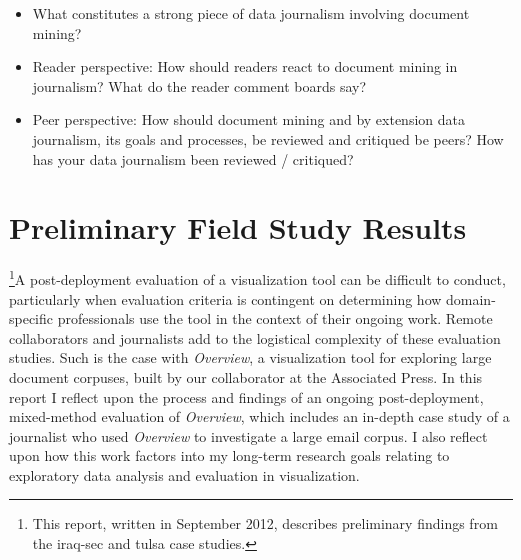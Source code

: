 
\begin{itemize}
    \item What constitutes a strong piece of data journalism involving document mining?
    \item Reader perspective: How should readers react to document mining in journalism? What do the reader comment boards say?
    \item Peer perspective: How should document mining and by extension data journalism, its goals and processes, be reviewed and critiqued be peers? How has your data journalism been reviewed / critiqued?
\end{itemize}


\section{Preliminary Field Study Results}
\label{app:overview:preliminary-results}


\footnote{This report, written in September 2012, describes preliminary findings from the {\sc iraq-sec} and {\sc tulsa} case studies.}A post-deployment evaluation of a visualization tool can be difficult to conduct, particularly when evaluation criteria is contingent on determining how domain-specific professionals use the tool in the context of their ongoing work. 
Remote collaborators and journalists add to the logistical complexity of these evaluation studies. 
Such is the case with {\it Overview}, a visualization tool for exploring large document corpuses, built by our collaborator at the Associated Press. 
In this report I reflect upon the process and findings of an ongoing post-deployment, mixed-method evaluation of {\it Overview}, which includes an in-depth case study of a journalist who used {\it Overview} to investigate a large email corpus. 
I also reflect upon how this work factors into my long-term research goals relating to exploratory data analysis and evaluation in visualization.  

